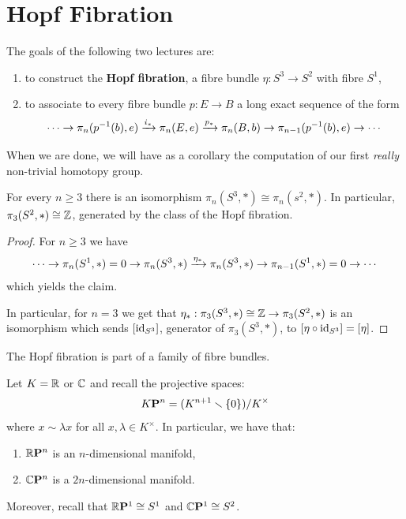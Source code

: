 
\section{Hopf Fibration}


The goals of the following two lectures are:
\begin{enumerate}
    \item to construct the \textbf{Hopf fibration}, a fibre bundle $\eta:S^3\to S^2$ with fibre $S^1$,
    \item to associate to every fibre bundle $p:E\to B$ a long exact sequence of the form
    \[\cdots\to\pi_n(p^{-1}(b),e)\xrightarrow{i_*}\pi_n(E,e)\xrightarrow{p_*}\pi_n(B,b)\to\pi_{n-1}(p^{-1}(b),e)\to\cdots\]
\end{enumerate}

When we are done, we will have as a corollary the computation of our first \textit{really} non-trivial homotopy group.

\begin{corollary}
For every $n\geq 3$ there is an isomorphism $\pi_n(S^3,*)\cong\pi_n(s^2,*)$. In particular, $\pi_3(S^2,*)\cong{\mathbb Z}$, generated by the class of the Hopf fibration.
\end{corollary}

\begin{proof}
For $n\geq3$ we have
\[\cdots\to\pi_n(S^1,*)=0\to\pi_n(S^3,*)\xrightarrow{\eta_*}\pi_n(S^3,*)\to\pi_{n-1}(S^1,*)=0\to\cdots\]
which yields the claim.

In particular, for $n=3$ we get that $\eta_*:\pi_3(S^3,*)\cong{\mathbb Z}\to\pi_3(S^2,*)$ is an isomorphism which sends $[\operatorname{id}_{S^3}]$, generator of $\pi_3(S^3,*)$, to $[\eta\circ\operatorname{id}_{S^3}]=[\eta]$.
\end{proof}

The Hopf fibration is part of a family of fibre bundles.

Let $K={\mathbb R}$ or $\mathbb{C}$ and recall the projective spaces:
\[{K\mathbf{P}^n}=(K^{n+1}\smallsetminus\{0\})/K^\times\]
where $x\sim\lambda x$ for all $x,\lambda\in K^\times$. In particular, we have that:
\begin{enumerate}[label={-}]
    \item ${{\mathbb R}\mathbf{P}^n}$ is an $n$-dimensional manifold,
    \item ${\mathbb{C}\mathbf{P}^n}$ is a $2n$-dimensional manifold.
\end{enumerate}
Moreover, recall that ${{\mathbb R}\mathbf{P}^{1}}\cong S^1$ and ${\mathbb{C}\mathbf{P}^{1}}\cong S^2$.

